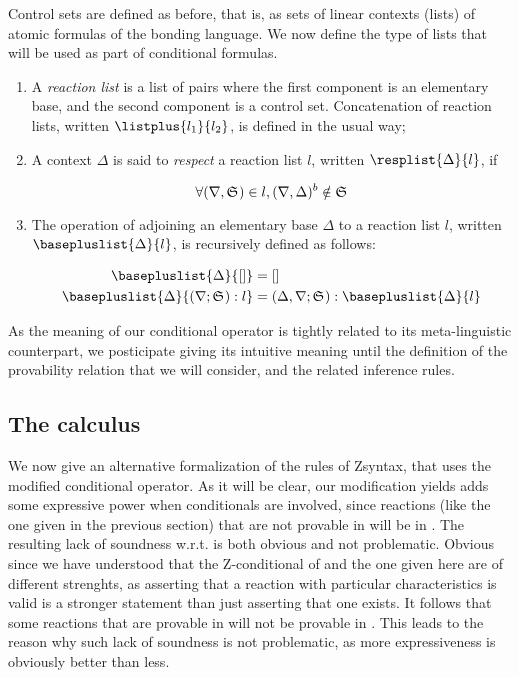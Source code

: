 Control sets are defined as before, that is, as sets of linear contexts (lists)
of atomic formulas of the bonding language. We now define the type of lists that
will be used as part of conditional formulas.

\begin{definition}
  \begin{enumerate}
  \item A \emph{reaction list} is a list of pairs where the first component is
    an elementary base, and the second component is a control set. Concatenation
    of reaction lists, written $\listplus{l_1}{l_2}$, is defined in the usual
    way;
  \item A context $\Delta$ is said to \emph{respect} a reaction list $l$,
    written $\resplist{\Delta}{l}$, if

    \[
      \forall (\nabla, \mathfrak{S}_{})\in l, (\nabla, \Delta)^{b} \notin \mathfrak{S}_{}
    \]

  \item The operation of adjoining an elementary base $\Delta$ to a reaction
    list $l$, written $\basepluslist{\Delta}{l}$, is recursively defined as
    follows:

    \begin{align*}
      \basepluslist{\Delta}{[]} &= [] \\
      \basepluslist{\Delta}{(\nabla;\ctrlset{}):l} &= (\Delta,\nabla;\ctrlset{}):\basepluslist{\Delta}{l}
    \end{align*}
  \end{enumerate}
\end{definition}

As the meaning of our conditional operator is tightly related to its
meta-linguistic counterpart, we posticipate giving its intuitive meaning until
the definition of the provability relation that we will consider, and the
related inference rules.

\subsection{The calculus \eznd{}}

We now give an alternative formalization of the rules of Zsyntax, that uses the
modified conditional operator. As it will be clear, our modification yields
adds some expressive power when conditionals are involved, since reactions
(like the one given in the previous section) that are not provable in \znd{}
will be in \eznd{}.
The resulting lack of soundness w.r.t. \znd{} is both obvious and not
problematic. Obvious since we have understood that the Z-conditional of \znd{}
and the one given here are of different strenghts, as asserting that a reaction
with particular characteristics is valid is a stronger statement than just
asserting that one exists. It follows that some reactions that are provable in
\eznd{} will not be provable in \znd{}. This leads to the reason why such lack
of soundness is not problematic, as more expressiveness is obviously better than
less.

